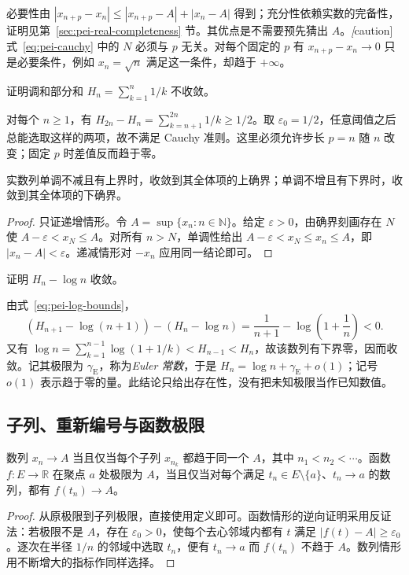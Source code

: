 必要性由 $|x_{n+p}-x_n|\le|x_{n+p}-A|+|x_n-A|$ 得到；充分性依赖实数的完备性，证明见第~\ref{sec:pei-real-completeness} 节。其优点是不需要预先猜出 $A$。\emph[caution]{式~\eqref{eq:pei-cauchy} 中的 $N$ 必须与 $p$ 无关。}对每个固定的 $p$ 有 $x_{n+p}-x_n\to0$ 只是必要条件，例如 $x_n=\sqrt n$ 满足这一条件，却趋于 $+\infty$。

\begin{example}
\label{ex:pei-harmonic-divergence}
证明调和部分和 $H_n=\sum_{k=1}^n1/k$ 不收敛。
\end{example}
\begin{solve}
对每个 $n\ge1$，有 $H_{2n}-H_n=\sum_{k=n+1}^{2n}1/k\ge1/2$。取 $\varepsilon_0=1/2$，任意阈值之后总能选取这样的两项，故不满足 Cauchy 准则。这里必须允许步长 $p=n$ 随 $n$ 改变；固定 $p$ 时差值反而趋于零。
\end{solve}

\begin{theorem}[单调有界原理]
\label{thm:pei-monotone}
实数列单调不减且有上界时，收敛到其全体项的上确界；单调不增且有下界时，收敛到其全体项的下确界。
\end{theorem}
\begin{proof}
只证递增情形。令 $A=\sup\{x_n:n\in\mathbb{N}\}$。给定 $\varepsilon>0$，由确界刻画存在 $N$ 使 $A-\varepsilon<x_N\le A$。对所有 $n>N$，单调性给出 $A-\varepsilon<x_N\le x_n\le A$，即 $|x_n-A|<\varepsilon$。递减情形对 $-x_n$ 应用同一结论即可。
\end{proof}

\begin{example}
\label{ex:pei-euler-constant}
证明 $H_n-\log n$ 收敛。
\end{example}
\begin{solve}
由式~\eqref{eq:pei-log-bounds}，
\[
    (H_{n+1}-\log(n+1))-(H_n-\log n)
    =\frac1{n+1}-\log\left(1+\frac1n\right)<0.
\]
又有 $\log n=\sum_{k=1}^{n-1}\log(1+1/k)<H_{n-1}<H_n$，故该数列有下界零，因而收敛。记其极限为 $\gamma_{\mathrm E}$，称为\emph{Euler 常数}，于是 $H_n=\log n+\gamma_{\mathrm E}+o(1)$；记号 $o(1)$ 表示趋于零的量。此结论只给出存在性，没有把未知极限当作已知数值。
\end{solve}

\subsection{子列、重新编号与函数极限}

\begin{theorem}
\label{thm:pei-heine}
数列 $x_n\to A$ 当且仅当每个子列 $x_{n_k}$ 都趋于同一个 $A$，其中 $n_1<n_2<\cdots$。函数 $f:E\to\mathbb{R}$ 在聚点 $a$ 处极限为 $A$，当且仅当对每个满足 $t_n\in E\setminus\{a\}$、$t_n\to a$ 的数列，都有 $f(t_n)\to A$。
\end{theorem}
\begin{proof}
从原极限到子列极限，直接使用定义即可。函数情形的逆向证明采用反证法：若极限不是 $A$，存在 $\varepsilon_0>0$，使每个去心邻域内都有 $t$ 满足 $|f(t)-A|\ge\varepsilon_0$。逐次在半径 $1/n$ 的邻域中选取 $t_n$，便有 $t_n\to a$ 而 $f(t_n)$ 不趋于 $A$。数列情形用不断增大的指标作同样选择。
\end{proof}

